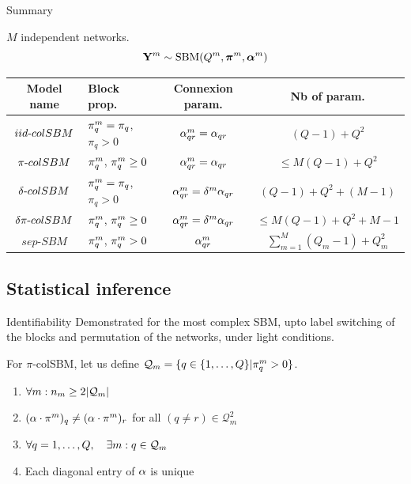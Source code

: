 \documentclass[compress,10pt]{beamer}
\begin{document}
\begin{frame}{Summary}
 
$M$ independent networks. 
$$ \mathbf{Y}^m \sim \mbox{SBM}(Q^m, \boldsymbol{\pi}^m,\boldsymbol{\alpha}^m)$$

{\footnotesize \begin{tabular}{|c|l|c|c|}
\hline
Model name & Block prop. & Connexion param. & Nb of param.\\
\hline
$iid\text{-} colSBM$& $\pi^{m}_q = \pi_q$, $\pi_q >0$&$\alpha^{m}_{qr} = \alpha_{qr}$&$ (Q-1)+ Q^2  $\\
\hline 
$\pi\text{-} colSBM$& $\pi^{m}_q$, $\pi^{m}_q \geq 0$ &$\alpha^{m}_{qr} = \alpha_{qr}$& $\leq M(Q-1)+Q^2$ \\
\hline 
$\delta \text{-} colSBM$ &$\pi^{m}_q = \pi_q$, $\pi_q >0$&$\alpha^{m}_{qr} = \delta^m\alpha_{qr}$&$ (Q-1) + Q^2 + (M-1) $\\
\hline
$\delta\pi\text{-} colSBM$& $\pi^{m}_q$, $\pi^{m}_q \geq 0$  &$\alpha^{m}_{qr} = \delta^m\alpha_{qr}$&$\leq M(Q-1)+Q^2 +  M-1$ \\
\hline 
$sep\text{-}SBM$ & $\pi^{m}_q$, $\pi^{m}_q>0$ & $\alpha^{m}_{qr}$&$\sum_{m=1}^M(Q_m-1) +  Q_m^2$\\
\hline
\end{tabular}
}

\end{frame}


\subsection{Statistical inference}

\begin{frame}{Identifiability}
Demonstrated for the most complex SBM, upto label switching of the blocks and permutation of the networks,  under light conditions.

For $\pi$-colSBM, let us define $\mathcal{Q}_m = \{q \in \{1, \dots, Q\} | \pi_q^m > 0\}$.  

    
  \begin{enumerate}
        \item $\forall m : n_m \geq 2|\mathcal{Q}_m|$
        \item $(\alpha \cdot \pi^{m})_{q} \neq (\alpha \cdot \pi^{m})_{r}$ for all $(q \neq r) \in \mathcal{Q}_m^2$
        \item $\forall q = 1, \dots, Q, \quad \exists m : q \in \mathcal{Q}_m$
        \item Each diagonal entry of $\alpha$ is unique
    \end{enumerate}    
\end{frame}
\end{document}
